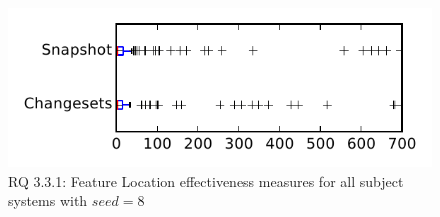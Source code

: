 
\begin{figure}
\centering
\includegraphics[height=0.4\textheight]{figures/flt_seed/rq1_tiny_8}
\caption{RQ 3.3.1: Feature Location effectiveness measures for all subject systems with $seed=8$}
\label{fig:flt_seed:rq1:tiny}
\end{figure}
